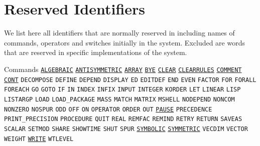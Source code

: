 \appendix
\chapter{Reserved Identifiers}

We list here all identifiers that are normally reserved in \REDUCE{}
including names of commands, operators and switches initially in the system.
Excluded are words that are reserved in specific implementations of the
system.

\vspace{13pt}
\begin{list}{}{\renewcommand{\makelabel}[1]{#1\hspace{\fill}}%
               \settowidth{\labelwidth}{Numerical Operators}%
               \setlength{\labelsep}{1em}%
	       \sloppy}

\item[Commands] \hyperlink{target:modes}{\texttt{ALGEBRAIC}}
\hyperlink{reserved:SYMMETRIC}{\texttt{ANTISYMMETRIC}}
\hyperlink{reserved:ARRAY}{\texttt{ARRAY}}
\hyperlink{reserved:BYE}{\texttt{BYE}}
\hyperlink{reserved:CLEAR}{\texttt{CLEAR}} \linebreak
\hyperlink{CLEARRULES}{\texttt{CLEARRULES}}
\hyperlink{comments}{\texttt{COMMENT}}
\hyperlink{CONT-and-PAUSE}{\texttt{CONT}} {\texttt{DECOMPOSE}} {\texttt{DEFINE}} {\texttt{DEPEND}} {\texttt{DISPLAY}} {\texttt{ED}}
{\texttt{EDITDEF}} {\texttt{END}} {\texttt{EVEN}} {\texttt{FACTOR}} {\texttt{FOR}} {\texttt{FORALL}}
{\texttt{FOREACH}} {\texttt{GO}} {\texttt{GOTO}} {\texttt{IF}} {\texttt{IN}} {\texttt{INDEX}} {\texttt{INFIX}}
{\texttt{INPUT}} {\texttt{INTEGER}} {\texttt{KORDER}} {\texttt{LET}} {\texttt{LINEAR}} {\texttt{LISP}}
{\texttt{LISTARGP}} {\texttt{LOAD}} {\tt LOAD\_PACKAGE} {\texttt{MASS}} {\texttt{MATCH}} {\texttt{MATRIX}} {\texttt{MSHELL}} {\texttt{NODEPEND}} {\texttt{NONCOM}} {\texttt{NONZERO}} {\texttt{NOSPUR}}
{\texttt{ODD}} {\texttt{OFF}}
{\texttt{ON}} {\texttt{OPERATOR}} {\texttt{ORDER}} {\texttt{OUT}}
\hyperlink{CONT-and-PAUSE}{\texttt{PAUSE}} {\texttt{PRECEDENCE}}
{\tt PRINT\_PRECISION} {\texttt{PROCEDURE}} {\texttt{QUIT}} {\texttt{REAL}} {\texttt{REMFAC}}
{\texttt{REMIND}} {\texttt{RETRY}} {\texttt{RETURN}} {\texttt{SAVEAS}} {\texttt{SCALAR}} {\texttt{SETMOD}} {\texttt{SHARE}} {\texttt{SHOWTIME}} {\texttt{SHUT}} {\texttt{SPUR}} \hyperlink{target:modes}{\texttt{SYMBOLIC}}
\hyperlink{reserved:SYMMETRIC}{\texttt{SYMMETRIC}} {\texttt{VECDIM}} {\texttt{VECTOR}} {\texttt{WEIGHT}}
\hyperlink{WRITE}{\texttt{WRITE}} {\texttt{WTLEVEL}}


\end{list}
